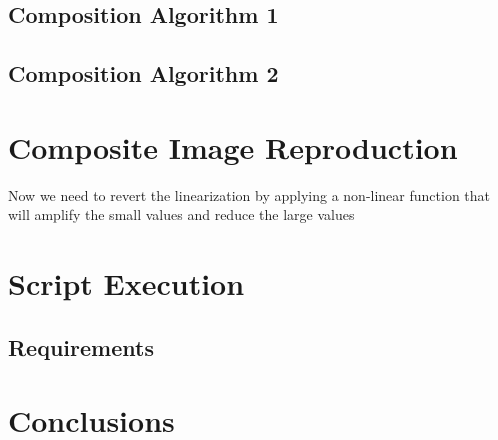 \documentclass[a4paper]{article}
\begin{document}
\subsection{Composition Algorithm 1}

\subsection{Composition Algorithm 2}
\section{Composite Image Reproduction}
Now we need to revert the linearization by applying a non-linear function that will amplify the small values and reduce the large values
\section{Script Execution}

\subsection{Requirements}
\section{Conclusions}


\end{document}
